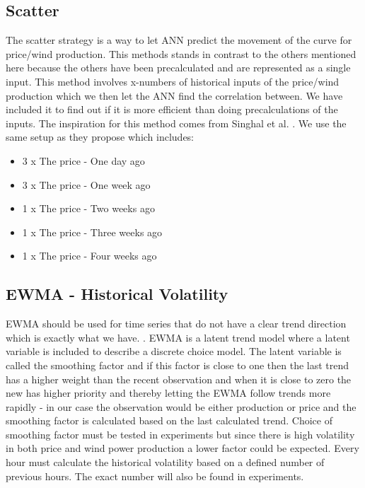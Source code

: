 \subsection{Scatter}
\label{sec:scatterStrategy}
The scatter strategy is a way to let ANN predict the movement of the curve for price/wind production. This methods stands in contrast to the others mentioned here because the others have been precalculated and are represented as a single input. This method involves x-numbers of historical inputs of the price/wind production which we then let the ANN find the correlation between. We have included it to find out if it is more efficient than doing precalculations of the inputs. The inspiration for this method comes from Singhal et al. \cite{singhal2011electricity}. We use the same setup as they propose which includes:

\begin{itemize}
	\item 3 x The price - One day ago
	\item 3 x The price - One week ago
	\item 1 x The price - Two weeks ago
	\item 1 x The price - Three weeks ago
	\item 1 x The price - Four weeks ago
\end{itemize}

\subsection{EWMA - Historical Volatility}
\label{sec:ewmaVolatility}
EWMA should be used for time series that do not have a clear trend direction\cite[Chapter~7.3.2]{econometrics} which is exactly what we have. . EWMA is a latent trend model where a latent variable is included to describe a discrete choice model. The latent variable is called the smoothing factor and if this factor is close to one then the last trend has a higher weight than the recent observation and when it is close to zero the new has higher priority and thereby letting the EWMA follow trends more rapidly - in our case the observation would be either production or price and the smoothing factor is calculated based on the last calculated trend. Choice of smoothing factor must be tested in experiments but since there is high volatility in both price and wind power production a lower factor could be expected. Every hour must calculate the historical volatility based on a defined number of previous hours. The exact number will also be found in experiments.

